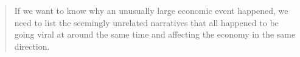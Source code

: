   \begin{quote}
    If we want to know why an unusually large economic event happened, we
    need to list the seemingly unrelated narratives that all happened to be
    going viral at around the same time and affecting the economy in the
    same direction.
  \end{quote}

